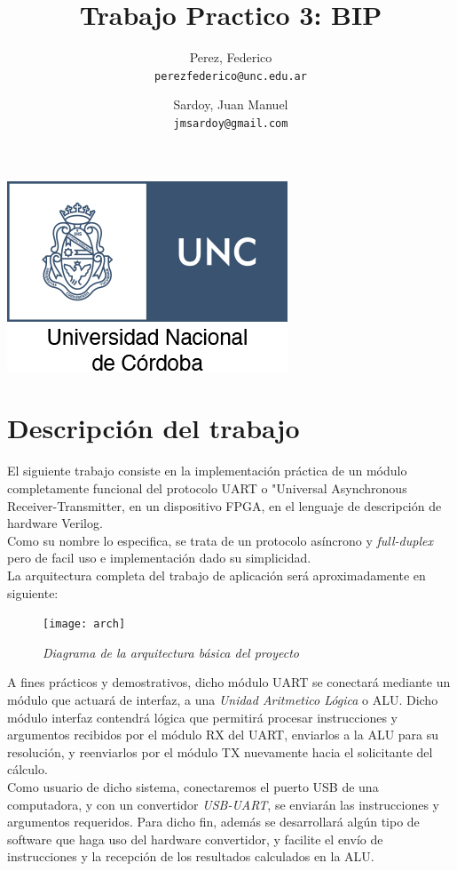 \documentclass{article}
\title{Trabajo Practico 3: BIP}
\author{Perez, Federico\\
        \texttt{perezfederico@unc.edu.ar}
        \and
        Sardoy, Juan Manuel\\
        \texttt{jmsardoy@gmail.com}
        }
\begin{document}
\maketitle
\begin{center}
    \includegraphics[scale=2]{unc-logo}
\end{center}
\newpage
\section{Descripción del trabajo}

El siguiente trabajo consiste en la implementación práctica de un módulo completamente
funcional del protocolo UART o "Universal Asynchronous Receiver-Transmitter, en un dispositivo FPGA,
en el lenguaje de descripción de hardware Verilog. \\
Como su nombre lo especifica, se trata de un protocolo asíncrono y \textit{full-duplex}
pero de facil uso e implementación dado su simplicidad.\\
La arquitectura completa del trabajo de aplicación será aproximadamente en siguiente:

\begin{figure}[H]
    \texttt{[image: arch]}
    \caption{\textit{Diagrama de la arquitectura básica del proyecto}}
\end{figure}

\indent A fines prácticos y demostrativos, dicho módulo UART se conectará mediante un
módulo que actuará de interfaz, a una \textit{Unidad Aritmetico Lógica} o ALU.
Dicho módulo interfaz contendrá lógica que permitirá procesar instrucciones y argumentos recibidos
por el módulo RX del UART, enviarlos a la ALU para su resolución, y reenviarlos por el módulo TX
nuevamente hacia el solicitante del cálculo. \\
\indent Como usuario de dicho sistema, conectaremos el puerto USB de una computadora, y con un convertidor
\textit{USB-UART}, se enviarán las instrucciones y argumentos requeridos. Para dicho fin, además se
desarrollará algún tipo de software que haga uso del hardware convertidor, y facilite el envío de instrucciones
y la recepción de los resultados calculados en la ALU.\\
\end{document}
